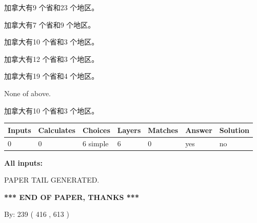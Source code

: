 \documentclass{ctexart}
\begin{document}
 
加拿大有9 个省和23 个地区。
 
 
加拿大有7 个省和9 个地区。
 
 
加拿大有10 个省和3 个地区。
 
 
加拿大有12 个省和3 个地区。
 
 
加拿大有19 个省和4 个地区。
 
 
 None of above.
 
 
\noindent{}
 
 
加拿大有10 个省和3 个地区。
 
 
\noindent{}
 
 
   
   
   
   
\noindent\begin{tabular}{|l|l|l|l|l|l|l|}
 \hline
Inputs & Calculates & Choices & Layers & Matches & Answer & Solution \\ \hline
 0  & 
 0  & 
 6
  simple  
  & 
 6  & 
 0  & 
  yes & 
  no 
  \\ \hline
 \end{tabular}
   
   
   
   
\noindent{}
   
   
   
   
\noindent\vspace{0.1in}\hspace{-0.08in} {\textbf{\Large{All inputs: }}}
   
   
   
   
   
   
 \vspace{0.2in}
 
   
   
\vspace{2.0in} PAPER TAIL GENERATED.
   
   
   
   
\vspace{1.0in} 
{\textbf{\large{ *** END OF PAPER, THANKS *** }}} 
   
   
\hspace{1.0in} By: 
 239 ( 416 ,  613 )
   
\end{document}
